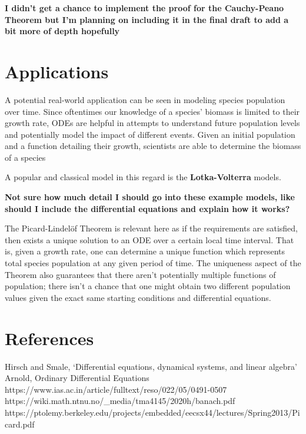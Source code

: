 \documentclass{article}
\begin{document}
\textbf{I didn't get a chance to implement the proof for the Cauchy-Peano Theorem but I'm planning on including it in the final draft to add a bit more of depth hopefully}

\section{Applications}
A potential real-world application can be seen in modeling species population over time. Since oftentimes our knowledge of a species' biomass is limited to their growth rate, ODEs are helpful in attempts to understand future population levels and potentially model the impact of different events. Given an initial population and a function detailing their growth, scientists are able to determine the biomass of a species

A popular and classical model in this regard is the \textbf{Lotka-Volterra} models.

\textbf{Not sure how much detail I should go into these example models, like should I include the differential equations and explain how it works?}

The Picard-Lindelöf Theorem is relevant here as if the requirements are satisfied, then exists a unique solution to an ODE over a certain local time interval. That is, given a growth rate, one can determine a unique function which represents total species population at any given period of time. The uniqueness aspect of the Theorem also guarantees that there aren't potentially multiple functions of population; there isn't a chance that one might obtain two different population values given the exact same starting conditions and differential equations.

\section{References}
Hirsch and Smale, ‘Differential equations, dynamical systems, and linear algebra’ \\ 
Arnold, Ordinary Differential Equations \\ 
https://www.ias.ac.in/article/fulltext/reso/022/05/0491-0507 \\ 
https://wiki.math.ntnu.no/\_media/tma4145/2020h/banach.pdf \\ 
https://ptolemy.berkeley.edu/projects/embedded/eecsx44/lectures/Spring2013/Picard.pdf\\
\end{document}
